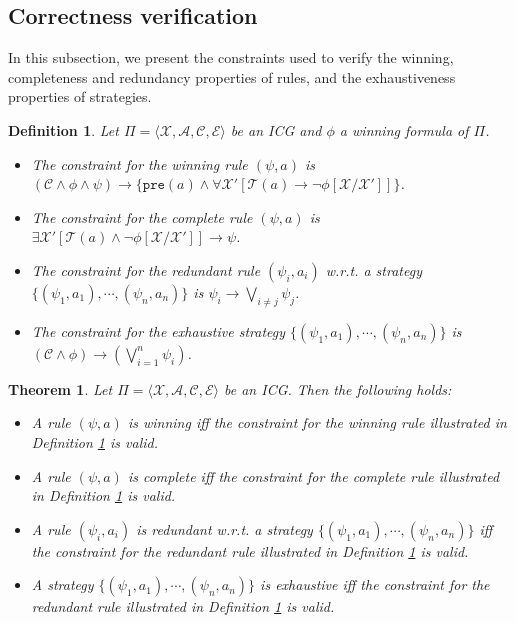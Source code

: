 \documentclass[review]{elsarticle}
\newcommand{\set}[1]{\{ #1 \}}
\newcommand{\tuple}[1]{\langle {#1} \rangle}
\newcommand{\statevar}{\mathcal{X}}
\newcommand{\act}{\mathcal{A}}
\newcommand{\trans}{\mathcal{T}}
\newcommand{\constraint}{\mathcal{C}}
\newcommand{\estate}{\mathcal{E}}
\newcommand{\pre}{\mathtt{pre}}
\newtheorem{definition}{Definition}
\newtheorem{theorem}{Theorem}
\begin{document}
\subsection{Correctness verification} \label{sec:winStrCorVer}
In this subsection, we present the constraints used to verify the winning, completeness and redundancy properties of rules, and the exhaustiveness properties of strategies.

\begin{definition} \label{def:consWinRule} \rm
	Let $\Pi = \tuple{\statevar, \act, \constraint, \estate}$ be an ICG and $\phi$ a winning formula of $\Pi$. %
	\begin{itemize}
		\item The constraint for the winning rule $(\psi, a)$ is $(\constraint \land \phi \land \psi) \rightarrow \{\pre(a) \land \forall \statevar' [\trans(a) \rightarrow \neg \phi[\statevar/\statevar']]\}$.
		
		\item The constraint for the complete rule $(\psi, a)$ is $\exists \statevar' [\trans(a) \land \neg \phi[\statevar/\statevar']] \rightarrow \psi$.
		
		\item The constraint for the redundant rule $(\psi_i, a_i)$ w.r.t. a strategy $\set{(\psi_1, a_1), \cdots, (\psi_n, a_n)}$ is $\psi_i \rightarrow \bigvee_{i \neq j} \psi_j$.
		
		\item The constraint for the exhaustive strategy $\set{(\psi_1, a_1), \cdots, (\psi_n, a_n)}$ is $(\constraint \land \phi) \rightarrow (\bigvee_{i = 1}^n \psi_i)$.
	\end{itemize}		
\end{definition}

\begin{theorem} \label{thm:consWinRule} 
	Let $\Pi = \tuple{\statevar, \act, \constraint, \estate}$ be an ICG.
	Then the following holds:
	\begin{itemize}
		\item A rule $(\psi, a)$ is winning iff the constraint for the winning rule illustrated in Definition \ref{def:consWinRule} is valid.		
		
		\item A rule $(\psi, a)$ is complete iff the constraint for the complete rule illustrated in Definition \ref{def:consWinRule} is valid.
		
		\item A rule $(\psi_i, a_i)$ is redundant w.r.t. a strategy $\set{(\psi_1, a_1), \cdots, (\psi_n, a_n)}$ iff the constraint for the redundant rule illustrated in Definition \ref{def:consWinRule} is valid.
		
		\item A strategy $\set{(\psi_1, a_1), \cdots, (\psi_n, a_n)}$ is exhaustive iff the constraint for the redundant rule illustrated in Definition \ref{def:consWinRule} is valid.
	\end{itemize}
\end{theorem}
\end{document}
